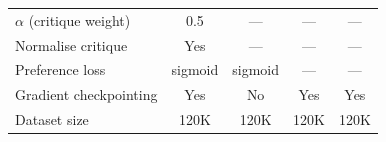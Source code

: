 \documentclass[11pt]{article}
\begin{document}
\begin{table}[H]
\begin{tabular}{lcccc}
        $\alpha$ (critique weight) & 0.5                                                        & ---          & ---               & ---                   \\
        Normalise critique         & Yes                                                        & ---          & ---               & ---                   \\
        Preference loss            & sigmoid                                                    & sigmoid      & ---               & ---                   \\
        Gradient checkpointing     & Yes                                                        & No           & Yes               & Yes                   \\
        Dataset size               & 120K                                                       & 120K         & 120K              & 120K                  \\
        \hline
    \end{tabular}
\end{table}

\newpage

\printbibliography
\end{document}
